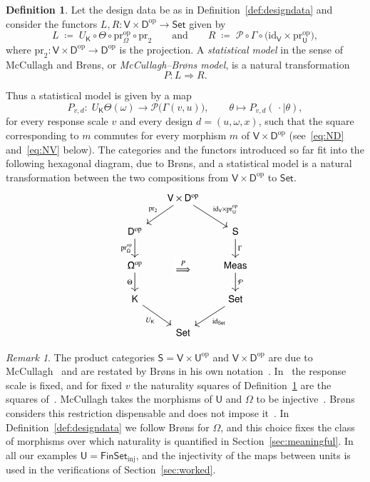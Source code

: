 \documentclass[11pt,a4paper]{article}
\theoremstyle{plain}
\theoremstyle{definition}
\newtheorem{definition}[theorem]{Definition}
\theoremstyle{remark}
\newtheorem{remark}[theorem]{Remark}
\newcommand{\cat}[1]{\mathsf{#1}}
\newcommand{\catU}{\cat{U}}
\newcommand{\catV}{\cat{V}}
\newcommand{\catO}{\cat{\Omega}}
\newcommand{\catS}{\cat{S}}
\newcommand{\catD}{\cat{D}}
\newcommand{\catK}{\cat{K}}
\newcommand{\Meas}{\cat{Meas}}
\newcommand{\Set}{\cat{Set}}
\newcommand{\FinSet}{\cat{FinSet}}
\newcommand{\Prb}{\mathcal{P}}
\newcommand{\op}{\mathrm{op}}
\newcommand{\id}{\mathrm{id}}
\newcommand{\pr}{\mathrm{pr}}
\begin{document}
\begin{definition}\label{def:mcbmodel}
Let the design data be as in Definition~\ref{def:designdata} and consider the
functors $L, R \colon \catV \times \catD^{\op} \to \Set$ given by
\[
L \;\coloneqq\; U_{\catK} \circ \Theta \circ \pr_{\catO}^{\op} \circ \pr_{2}
\qquad\text{and}\qquad
R \;\coloneqq\; \Prb \circ \Gamma \circ \bigl(\id_{\catV} \times \pr_{\catU}^{\op}\bigr),
\]
where $\pr_2 \colon \catV \times \catD^{\op} \to \catD^{\op}$ is the
projection. A \emph{statistical model} in the sense of McCullagh and Br\o ns,
or \emph{McCullagh--Br\o ns model}, is a natural transformation
\[
P \colon L \Longrightarrow R.
\]
\end{definition}

Thus a statistical model is given by a map
\[
P_{v,d} \colon \; U_\catK\Theta(\omega) \longrightarrow \Prb\bigl(\Gamma(v,u)\bigr),
\qquad \theta \longmapsto P_{v,d}(\,\cdot \mid \theta),
\]
for every response scale $v$ and every design $d = (u,\omega,x)$, such that the
square corresponding to $m$ commutes for every morphism $m$ of
$\catV \times \catD^{\op}$ (see~\eqref{eq:ND} and~\eqref{eq:NV} below). The
categories and the functors introduced so far fit into the following hexagonal
diagram, due to Br\o ns, and a statistical model is a natural transformation
between the two compositions from $\catV \times \catD^{\op}$ to $\Set$.
\[
\begin{tikzcd}[column sep=1.6em, row sep=1.9em]
& \catV \times \catD^{\op}
\arrow[dl, "\pr_2"'] \arrow[dr, "\id_\catV \times \pr_\catU^{\op}"] & \\
\catD^{\op} \arrow[d, "\pr_\catO^{\op}"'] & & \catS \arrow[d, "\Gamma"] \\
\catO^{\op} \arrow[d, "\Theta"'] \arrow[rr, phantom, "\overset{P}{\Longrightarrow}" description] & & \Meas \arrow[d, "\Prb"] \\
\catK \arrow[dr, "U_\catK"']
& & \Set \arrow[dl, "\id_{\Set}"]\\
&\Set
\end{tikzcd}
\]

\begin{remark}\label{rem:attribution}
The product categories $\catS = \catV \times \catU^{\op}$ and
$\catV \times \catD^{\op}$ are due to
McCullagh~\cite[\S4.7, p.~1240]{mccullagh_what_2002} and are restated by
Br\o ns in his own notation~\cite[p.~1280]{brons_discussion_2002}.
In~\cite[\S4.2]{mccullagh_what_2002} the response scale is fixed, and for fixed
$v$ the naturality squares of Definition~\ref{def:mcbmodel} are the squares
of~\cite[p.~1236]{mccullagh_what_2002}. McCullagh takes the morphisms of
$\catU$ and $\catO$ to be injective~\cite[\S4.1]{mccullagh_what_2002}. Br\o ns
considers this restriction dispensable and does not impose
it~\cite[p.~1281]{brons_discussion_2002}. In
Definition~\ref{def:designdata} we follow Br\o ns for $\catO$, and this choice
fixes the class of morphisms over which naturality is quantified in
Section~\ref{sec:meaningful}. In all our examples
$\catU = \FinSet_{\mathrm{inj}}$, and the injectivity of the maps between units
is used in the verifications of Section~\ref{sec:worked}.
\end{remark}
\end{document}
